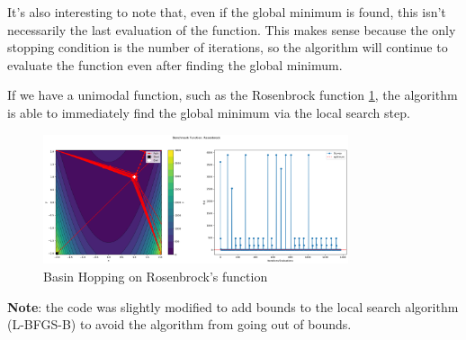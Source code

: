 It's also interesting to note that, even if the global minimum is found, this isn't necessarily the last evaluation of the function. This makes sense because the only stopping condition is the number of iterations, so the algorithm will continue to evaluate the function even after finding the global minimum. 

If we have a unimodal function, such as the Rosenbrock function \ref*{fig:bh-rosenbrock}, the algorithm is able to immediately find the global minimum via the local search step.
\begin{figure}[H]
    \centering
    \includegraphics[width=0.8\textwidth]{lab2/imgs/bh_rosenbrock.png}
    \caption{Basin Hopping on Rosenbrock's function}
    \label{fig:bh-rosenbrock}
\end{figure}

\noindent
\textbf{Note}: the code was slightly modified to add bounds to the local search algorithm (L-BFGS-B) to avoid the algorithm from going out of bounds.

